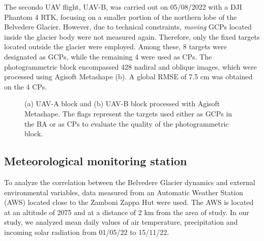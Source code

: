 The secondo UAV flight, UAV-B, was carried out on 05/08/2022 with a DJI Phantom
4 RTK, focusing on a smaller portion of the northern lobe of the Belvedere Glacier.
However, due to technical constraints, \textit{moving} GCPs located inside the
glacier body were not measured again.
Therefore, only the fixed targets located outside the glacier were employed.
Among these, 8 targets were designated as GCPs, while the remaining 4 were used as CPs.
The photogrammetric block encompassed 428 nadiral and oblique images, which
were processed using Agisoft Metashape (b).
A global RMSE of 7.5 cm was obtained on the 4 CPs.

\begin{figure}
  \centering
  \caption{(a) UAV-A block and (b) UAV-B block processed with Agisoft Metashape. The
    flags represent the targets used either as GCPs in the BA or as CPs to evaluate the
    quality of the photogrammetric block.}
  \label{fig:4:uavblocks}
\end{figure}

\subsection{Meteorological monitoring station}\label{sec:4:meteostation}

To analyze the correlation between the Belvedere Glacier dynamics and
external environmental variables, data measured from an Automatic Weather Station (AWS)
located close to the Zamboni Zappa Hut were used.
The AWS is located at an altitude of \SI{2075}{\masl} and at a distance of
2 km from the area of study.
In our study, we analyzed mean daily values of air temperature, precipitation and
incoming solar radiation from 01/05/22 to 15/11/22.

